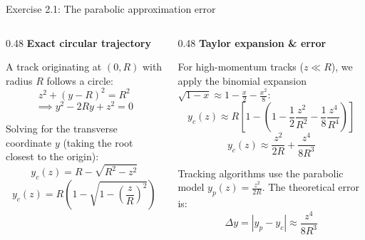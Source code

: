 \begin{frame}{Exercise 2.1: The parabolic approximation error}
    \begin{columns}[T]
        
        \begin{column}{0.48\textwidth}
            \textbf{Exact circular trajectory}
            
            \small
            A track originating at $(0,R)$ with radius $R$ follows a circle:
            $$ z^2 + (y-R)^2 = R^2 $$
            $$ \implies y^2 - 2Ry + z^2 = 0 $$
            
            Solving for the transverse coordinate $y$ (taking the root closest to the origin):
            $$ y_c(z) = R - \sqrt{R^2 - z^2} $$
            $$ y_c(z) = R\left(1 - \sqrt{1 - \left(\frac{z}{R}\right)^2}\right) $$
        \end{column}
        
        \begin{column}{0.48\textwidth}
            \textbf{Taylor expansion \& error}
            
            \small
            For high-momentum tracks ($z \ll R$), we apply the binomial expansion $\sqrt{1-x} \approx 1 - \frac{x}{2} - \frac{x^2}{8}$:
            $$ y_c(z) \approx R\left[ 1 - \left( 1 - \frac{1}{2}\frac{z^2}{R^2} - \frac{1}{8}\frac{z^4}{R^4} \right) \right] $$
            $$ y_c(z) \approx \frac{z^2}{2R} + \frac{z^4}{8R^3} $$
            
            Tracking algorithms use the parabolic model $y_p(z) = \frac{z^2}{2R}$. The theoretical error is:
            $$ \Delta y = |y_p - y_c| \approx \frac{z^4}{8R^3} $$
        \end{column}
        
    \end{columns}
\end{frame}

